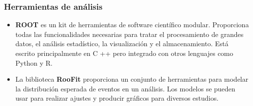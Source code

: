 \documentclass[11pt]{beamer}
\begin{document}
\begin{frame}
\frametitle{Herramientas de an\'alisis}
\scriptsize{
\begin{itemize}
\item  \textbf{ROOT} es un kit de herramientas de software científico modular. Proporciona todas las funcionalidades necesarias para tratar el procesamiento de grandes datos, el análisis estadístico, la visualización y el almacenamiento. Está escrito principalmente en C ++ pero integrado con otros lenguajes como Python y R.

\item La biblioteca \textbf{RooFit} proporciona un conjunto de herramientas para modelar la distribución esperada de eventos en un análisis. Los modelos se pueden usar para realizar ajustes y  producir gráficos  para diversos estudios.

\end{itemize}
}
\end{frame}

\end{document}
